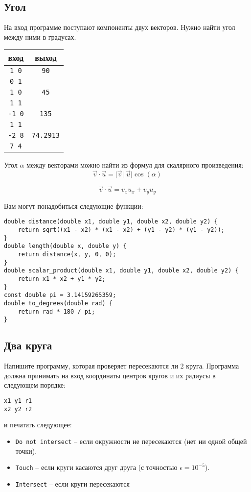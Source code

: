 \documentclass{article}
\begin{document}
\subsection{Угол}
На вход программе поступают компоненты двух векторов. Нужно найти угол между ними в градусах.
\begin{center}
\begin{tabular}{ c c }
 вход & выход \\ \hline
 \texttt{1 0} & \texttt{90}  \\ 
 \texttt{0 1} &   \\  \hline
 \texttt{1 0} & \texttt{45}  \\ 
 \texttt{1 1} &   \\  \hline
 \texttt{-1 0} & \texttt{135}  \\ 
 \texttt{1 1} &   \\  \hline
 \texttt{-2 8} & \texttt{74.2913}  \\ 
 \texttt{7 4} &   \\
\end{tabular}
\end{center}

Угол $\alpha$ между векторами можно найти из формул для скалярного произведения:
\begin{equation*}
\vec{v} \cdot \vec{u} = \lvert \vec{v} \rvert  \lvert \vec{u} \rvert \cos(\alpha)
\end{equation*}

\begin{equation*}
\vec{v} \cdot \vec{u} = v_x u_x + v_y u_y
\end{equation*}

Вам могут понадобиться следующие функции:
\begin{lstlisting}
double distance(double x1, double y1, double x2, double y2) {
    return sqrt((x1 - x2) * (x1 - x2) + (y1 - y2) * (y1 - y2));
}
double length(double x, double y) {
    return distance(x, y, 0, 0);
}
double scalar_product(double x1, double y1, double x2, double y2) {
    return x1 * x2 + y1 * y2;
}
const double pi = 3.14159265359;
double to_degrees(double rad) {
    return rad * 180 / pi;
}
\end{lstlisting}



\subsection{Два круга}
Напишите программу, которая проверяет пересекаются ли 2 круга. Программа должна принимать на вход координаты центров кругов и их радиусы в следующем порядке:
\begin{verbatim}
x1 y1 r1
x2 y2 r2
\end{verbatim}
и печатать следующее:
\begin{itemize}
\item \texttt{Do not intersect} -- если окружности не пересекаются (нет ни одной общей точки).
\item \texttt{Touch} -- если круги касаются друг друга (с точностью $\epsilon = 10^{-5}$).
\item \texttt{Intersect} -- если круги пересекаются
\end{itemize}
\end{document}
